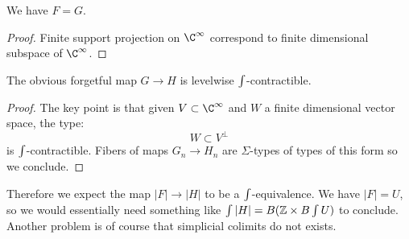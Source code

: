\begin{lemma}
We have $F=G$.
\end{lemma}

\begin{proof}
Finite support projection on $\C^\infty$ correspond to finite dimensional subspace of $\C^\infty$.
\end{proof}

\begin{lemma}
The obvious forgetful map $G\to H$ is levelwise $\int$-contractible.
\end{lemma}

\begin{proof}
The key point is that given $V\subset \C^\infty$ and $W$ a finite dimensional vector space, the type:
\[W\subset V^\perp\]
is $\int$-contractible. Fibers of maps $G_n\to H_n$ are $\Sigma$-types of types of this form so we conclude.
\end{proof}

Therefore we expect the map $|F| \to |H|$ to be a $\int$-equivalence. We have $|F| = U$, so we would essentially need something like $\int |H| = B(\mathbb{Z}\times B\int U)$ to conclude. Another problem is of course that simplicial colimits do not exists.

